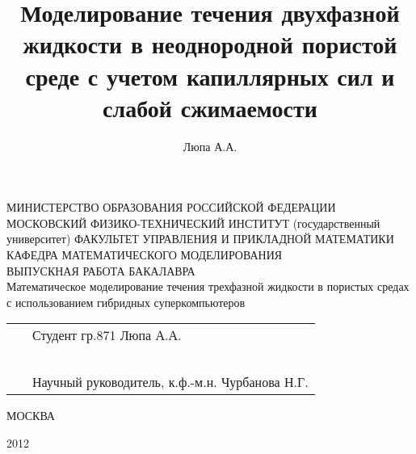 \documentclass[a4paper,12pt]{article}
\author{Люпа А.А.}
\title{Моделирование течения двухфазной жидкости в неоднородной пористой среде с учетом капиллярных сил и слабой сжимаемости}
\date{}
\begin{document}
\renewcommand{\theequation}{\thesection.\arabic{equation}}

\clearpage
\begin{titlepage}
\linespread{1}
\centering
МИНИСТЕРСТВО ОБРАЗОВАНИЯ РОССИЙСКОЙ ФЕДЕРАЦИИ \newline  \newline  \newline
МОСКОВСКИЙ ФИЗИКО-ТЕХНИЧЕСКИЙ ИНСТИТУТ \newline 
(государственный университет)
\underline{\hspace{\textwidth}}
ФАКУЛЬТЕТ УПРАВЛЕНИЯ И ПРИКЛАДНОЙ МАТЕМАТИКИ \\
КАФЕДРА МАТЕМАТИЧЕСКОГО МОДЕЛИРОВАНИЯ \\
%
\vspace{20ex}
\large{ВЫПУСКНАЯ РАБОТА БАКАЛАВРА} \\
\vspace{2ex}
Математическое моделирование течения трехфазной жидкости в пористых средах с использованием гибридных суперкомпьютеров
\vspace{20ex}

\begin{tabularx}{\textwidth}{XX} %
	&   %
	Студент гр.871  \newline
	Люпа А.А.
	  \\
	\mbox{ } & \mbox{ } \\
%
	&   Научный руководитель,  \newline
	к.ф.-м.н. Чурбанова Н.Г.
\end{tabularx}

\vspace{\fill}
МОСКВА 

2012
\clearpage
\end{titlepage}

\newpage
\tableofcontents
\newpage









\makeatletter
\renewcommand{\@biblabel}[1]{#1.\hfil}
\makeatother
\addto{}
\nocite{*}

\end{document}
